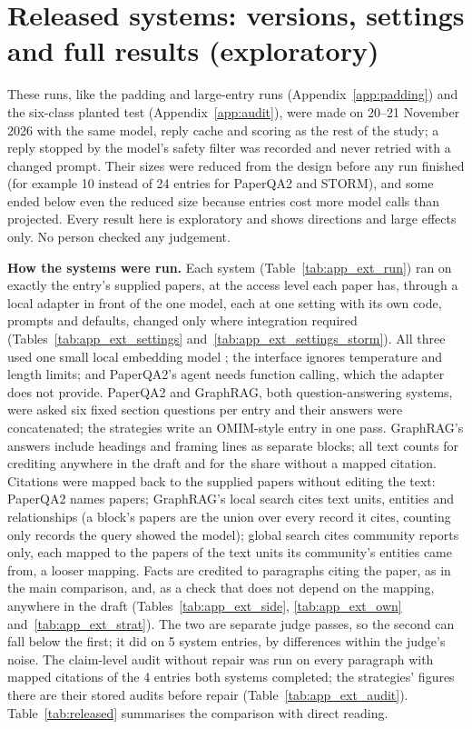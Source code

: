 \documentclass{article} %
\begin{document}
\section{Released systems: versions, settings and full results (exploratory)}
\label{app:released}
These runs, like the padding and large-entry runs (Appendix~\ref{app:padding}) and the six-class planted test (Appendix~\ref{app:audit}), were made on 20--21 November 2026 with the same model, reply cache and scoring as the rest of the study; a reply stopped by the model's safety filter was recorded and never retried with a changed prompt. Their sizes were reduced from the design before any run finished (for example 10 instead of 24 entries for PaperQA2 and STORM), and some ended below even the reduced size because entries cost more model calls than projected. Every result here is exploratory and shows directions and large effects only. No person checked any judgement.

\textbf{How the systems were run.} Each system (Table~\ref{tab:app_ext_run}) ran on exactly the entry's supplied papers, at the access level each paper has, through a local adapter in front of the one model, each at one setting with its own code, prompts and defaults, changed only where integration required (Tables~\ref{tab:app_ext_settings} and~\ref{tab:app_ext_settings_storm}). All three used one small local embedding model \citep{Xiao2023CpackPacked}; the interface ignores temperature and length limits; and PaperQA2's agent needs function calling, which the adapter does not provide. PaperQA2 and GraphRAG, both question-answering systems, were asked six fixed section questions per entry and their answers were concatenated; the strategies write an OMIM-style entry in one pass. GraphRAG's answers include headings and framing lines as separate blocks; all text counts for crediting anywhere in the draft and for the share without a mapped citation. Citations were mapped back to the supplied papers without editing the text: PaperQA2 names papers; GraphRAG's local search cites text units, entities and relationships (a block's papers are the union over every record it cites, counting only records the query showed the model); global search cites community reports only, each mapped to the papers of the text units its community's entities came from, a looser mapping. Facts are credited to paragraphs citing the paper, as in the main comparison, and, as a check that does not depend on the mapping, anywhere in the draft (Tables~\ref{tab:app_ext_side}, \ref{tab:app_ext_own} and~\ref{tab:app_ext_strat}). The two are separate judge passes, so the second can fall below the first; it did on 5 system entries, by differences within the judge's noise. The claim-level audit without repair was run on every paragraph with mapped citations of the 4 entries both systems completed; the strategies' figures there are their stored audits before repair (Table~\ref{tab:app_ext_audit}). Table~\ref{tab:released} summarises the comparison with direct reading.
\end{document}
